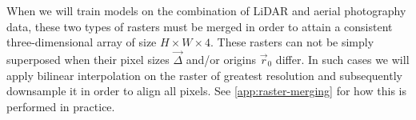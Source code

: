 When we will train models on the combination of LiDAR and aerial photography data, these two types of rasters must be merged in order to attain a consistent three-dimensional array of size $H \times W \times 4$.
These rasters can not be simply superposed when their pixel sizes $\vec{\Delta}$ and/or origins $\vec{r}_0$ differ.
In such cases we will apply bilinear interpolation on the raster of greatest resolution and subsequently downsample it in order to align all pixels.
See \cref{app:raster-merging} for how this is performed in practice.
